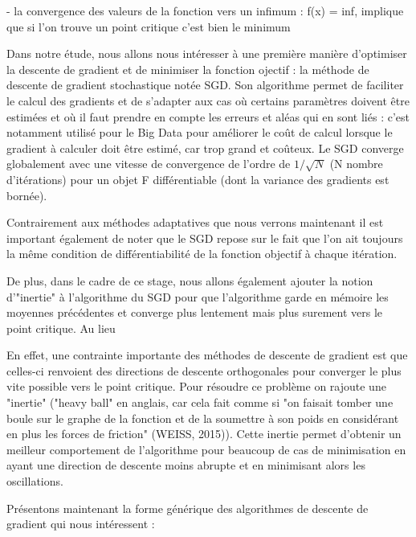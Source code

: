 \documentclass{article}
\begin{document}
- la convergence des valeurs de la fonction vers un infimum : f(x) = inf, implique que si l'on trouve un point critique c'est bien le minimum

\bigskip

Dans notre étude, nous allons nous intéresser à une première manière d'optimiser la descente de gradient et de minimiser la fonction ojectif : la méthode de descente de gradient stochastique notée SGD. Son algorithme permet de faciliter le calcul des gradients et de s'adapter aux cas où certains paramètres doivent être estimées et où il faut prendre en compte les erreurs et aléas qui en sont liés : c'est notamment utilisé pour le Big Data pour améliorer le coût de calcul lorsque le gradient à calculer doit être estimé, car trop grand et coûteux. Le SGD converge globalement avec une vitesse de convergence de l'ordre de $1/\sqrt{N}$ (N nombre d'itérations) pour un objet F différentiable (dont la variance des gradients est bornée).

\bigskip

Contrairement aux méthodes adaptatives que nous verrons maintenant il est important également de noter que le SGD repose sur le fait que l'on ait toujours la même condition de différentiabilité de la fonction objectif à chaque itération. 

\bigskip

De plus, dans le cadre de ce stage, nous allons également ajouter la notion d'"inertie" à l'algorithme du SGD pour que l'algorithme garde en mémoire les moyennes précédentes et converge plus lentement mais plus surement vers le point critique. Au lieu 

\bigskip

En effet, une contrainte importante des méthodes de descente de gradient est que celles-ci renvoient des directions de descente orthogonales pour converger le plus vite possible vers le point critique. Pour résoudre ce problème on rajoute une "inertie" ("heavy ball" en anglais, car cela fait comme si "on faisait tomber une boule sur le graphe de la fonction et de la soumettre à son poids en considérant en plus les forces de friction" (WEISS, 2015)). Cette inertie permet d'obtenir un meilleur comportement de l'algorithme pour beaucoup de cas de minimisation en ayant une direction de descente moins abrupte et en minimisant alors les oscillations.

\bigskip

Présentons maintenant la forme générique des algorithmes de descente de gradient qui nous intéressent :
\end{document}
